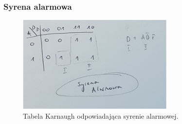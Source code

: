 \documentclass{article}
\begin{document}
\subsubsection{Syrena alarmowa}
\begin{figure}[H]
\includegraphics[width=0.7\textwidth]{syrena}
\caption{Tabela Karnaugh odpowiadająca syrenie alarmowej.}
\end{figure}
\end{document}
